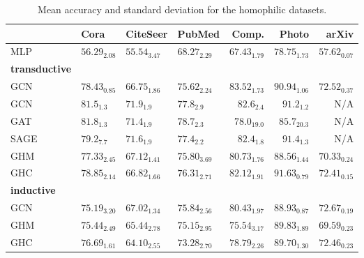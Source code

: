 \documentclass[conference]{IEEEtran}
\begin{document}
\begin{table}
\centering
\caption{Mean accuracy and standard deviation for the homophilic datasets.}
\label{tab:results_ho}
\begin{tabular}{l|lll|rr|r} \toprule
& Cora & CiteSeer & PubMed & Comp. & Photo & arXiv  \\ \midrule
MLP & $56.29_{2.08}$ & $55.54_{3.47}$ & $68.27_{2.29}$ & $67.43_{1.79}$ & $78.75_{1.73}$ & $57.62_{0.07}$ \\  \midrule \midrule
\textbf{transductive} \\ 
GCN & $78.43_{0.85}$ & $66.75_{1.86}$ & $75.62_{2.24}$ & $\mathbf{83.52_{1.73}}$ & $90.94_{1.06}$ & $\mathbf{72.52_{0.37}}$ \\ 
GCN~\cite{shchur} & $81.5_{1.3}$ & $\mathbf{71.9_{1.9}}$ & $77.8_{2.9}$ & $82.6_{2.4}$ & $91.2_{1.2}$ & N/A \\
GAT~\cite{shchur} & $\mathbf{81.8_{1.3}}$ & $71.4_{1.9}$ & $\mathbf{78.7_{2.3}}$ & $78.0_{19.0}$ &  $85.7_{20.3}$ & N/A \\
SAGE~\cite{shchur} & $79.2_{7.7}$ & $71.6_{1.9}$ & $77.4_{2.2}$ & $82.4_{1.8}$ & $91.4_{1.3}$ & N/A \\
\midrule
GHM & $77.33_{2.45}$ & $67.12_{1.41}$ & $75.80_{3.69}$ & $80.73_{1.76}$ & $88.56_{1.44}$ & $70.33_{0.24}$ \\ 
GHC & $78.85_{2.14}$ & $66.82_{1.66}$ & $76.31_{2.71}$ & $82.12_{1.91}$ & $\mathbf{91.63_{0.79}}$ & $72.41_{0.15}$ \\ \midrule \midrule
\textbf{inductive} \\
GCN & $75.19_{3.20}$ & $\mathbf{67.02_{1.34}}$ & $\mathbf{75.84_{2.56}}$ & $\mathbf{80.43_{1.97}}$ & $88.93_{0.87}$ & $\mathbf{72.67_{0.19}}$ \\
GHM & $75.44_{2.49}$ & $65.44_{2.78}$ & $75.15_{2.95}$ & $75.54_{3.17}$ & $\mathbf{89.83_{1.89}}$ & $69.59_{0.23}$ \\ 
GHC & $\mathbf{76.69_{1.61}}$ & $64.10_{2.55}$ & $73.28_{2.70}$ & $78.79_{2.26}$ & $89.70_{1.30}$ & $72.46_{0.23}$ \\ \bottomrule
\end{tabular}
\end{table}
\end{document}
